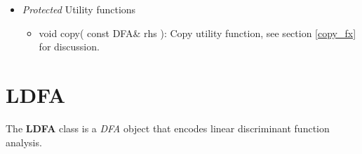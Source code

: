 \documentclass{report}
\def\beginred{\color{red}}
\def\endcolor{\color{black}}
\begin{document}
\begin{itemize}
\begin{itemize}
\item Matrix$<$ double $>$ $D0$, $D1$: Matrices for inputs of 1-output
      datasets
\item vector$<$ Matrix$<$ double $>$ $>$ $D$: a vector of Matrices for
      inputs of multiple output datasets
\item vector$<$ double $>$ $X$: holds inputs for 1 exemplar
\item vector$<$ double $>$ $U0$, $U1$: mean vectors for 1-output
      datasets
\item vector$<$ vector$<$ double $>$ $>$ $U$: a vector of mean vectors
      for multiple output datasets
\item double $P0$, $P1$: a priori probabilities for 1-output datasets
\item vector$<$ double $>$ $P$: a priori probabilities for multiple
      output datasets
\item double $K0$, $K1$: constants for 1-output datasets
\item vector$<$ double $>$ $K$: constants for multiple output datasets
\item double $d0$, $d1$: discriminant function results for 1-output
      datasets
\item vector$<$ double $>$ $d$: discriminant function results for
      multiple output datasets
\item vector$<$ unsigned $>$ $trainClasses$: outputs for multiple
      output training sets
\item vector$<$ unsigned $>$ $testClasses$: outputs for multiple
      output test sets
\end{itemize}

\item {\em Protected} Utility functions

\begin{itemize}
\item \beginred void copy( const DFA\& rhs ): Copy utility
      function, see section \ref{copy_fx} for discussion. \endcolor
\end{itemize}

\end{itemize}

\section{LDFA}

The {\bf LDFA} class is a {\em DFA} object that encodes linear
discriminant function analysis.
\end{document}
